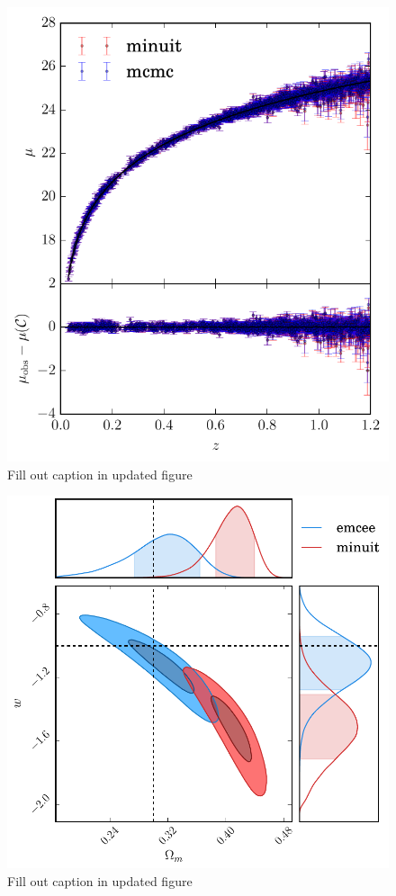 \documentclass[a4paper,fleqn,usenatbib]{mnras}
\newcommand{\red}{\color{red}}
\begin{document}
\begin{figure}
	\includegraphics[width=\columnwidth]{../output/obs_cosmology_deep.pdf}
	\caption{{\red Fill out caption in updated figure}}
	\label{fig:obs_cosmology_deep}
\end{figure}
\begin{figure}
	\includegraphics[width=\columnwidth]{../output/comparison_shallow.pdf}
	\caption{{\red Fill out caption in updated figure}}
	\label{fig:comparison_shallow}
\end{figure}
\end{document}
